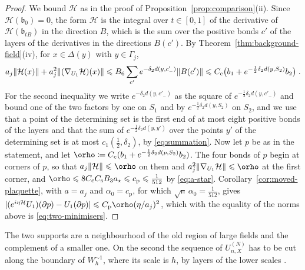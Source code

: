 \documentclass[11pt]{preprint}
\let\rho\orho
\DeclarePairedDelimiter{\abs}{\lvert}{\rvert}
\DeclarePairedDelimiter{\norm}{\lVert}{\rVert}
\numberwithin{equation}{section}
\begin{document}
\begin{proof}
We bound $\mathcal H$ as in the proof of Proposition~\ref{prop:comparison}(ii). Since $\mathcal H(\mathfrak b_0) = 0$, the form $\mathcal H$ is the integral over $t \in [0, 1]$ of the derivative of $\mathcal H(\mathfrak b_{tB})$ in the direction $B$, which is the sum over the positive bonds $c'$ of the layers of the derivatives in the directions $B(c')$. By Theorem~\ref{thm:background-field}(iv), for $x \in \Delta(y)$ with $y \in \Gamma_j$,
\[
    a_j\norm{\mathcal H(x)} + a_j^2\norm{(\nabla_{U_1}\mathcal H)(x)} \leqslant B_6\sum_{c'}e^{-\delta_2d(y, c'_-)}\norm{B(c')} \leqslant C_{\mathrm c}\bigl(b_1 + e^{-\frac{1}{2}\delta_2d(y, S_2)}b_2\bigr)\;.
\]
For the second inequality we write $e^{-\delta_2d(y, c'_-)}$ as the square of $e^{-\frac{1}{2}\delta_2d(y, c'_-)}$ and bound one of the two factors by one on $S_1$ and by $e^{-\frac{1}{2}\delta_2d(y, S_2)}$ on $S_2$, and we use that a point of the determining set is the first end of at most eight positive bonds of the layers and that the sum of $e^{-\frac{1}{2}\delta_2d(y, y')}$ over the points $y'$ of the determining set is at most $c_1(\frac{1}{2}, \delta_2)$, by \eqref{eq:summation}. Now let $p$ be as in the statement, and let $\rho \coloneqq C_{\mathrm c}(b_1 + e^{-\frac{1}{2}\delta_2d(p, S_2)}b_2)$. The four bonds of $p$ begin at corners of $p$, so that $a_j\norm{\mathcal H} \leqslant \rho$ on them and $a_j^2\norm{\nabla_{U_1}\mathcal H} \leqslant \rho$ at the first corner, and $\rho \leqslant 8C_{\mathrm c}C_{\mathrm s}B_3a_\star \leqslant c_{\mathrm p} \leqslant \frac{1}{512}$ by \eqref{eq:a-star}. Corollary~\ref{cor:moved-plaquette}, with $a = a_j$ and $\alpha_0 = c_{\mathrm p}$, for which $\sqrt{\mathsf n}\,\alpha_0 = \frac{1}{512}$, gives $\abs{(e^{i\eta\mathcal H}U_1)(\partial p) - U_1(\partial p)} \leqslant C_{\mathrm p}\rho(\eta/a_j)^2$, which with the equality of the norms above is \eqref{eq:two-minimisers}.
\end{proof}

The two supports are a neighbourhood of the old region of large fields and the complement of a smaller one. On the second the sequence of $U^{(N)}_{n,X}$ has to be cut along the boundary of $W_h^{\sim1}$, where its scale is $h$, by layers of the lower scales \cite[p.~199]{BalabanLFR1}.
\end{document}
